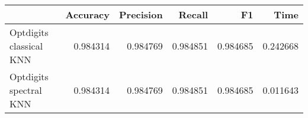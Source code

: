 \begin{tabular}{lrrrrr}
\toprule
{} &  Accuracy &  Precision &    Recall &        F1 &      Time \\
\midrule
Optdigits classical KNN &  0.984314 &   0.984769 &  0.984851 &  0.984685 &  0.242668 \\
Optdigits spectral KNN  &  0.984314 &   0.984769 &  0.984851 &  0.984685 &  0.011643 \\
\bottomrule
\end{tabular}
